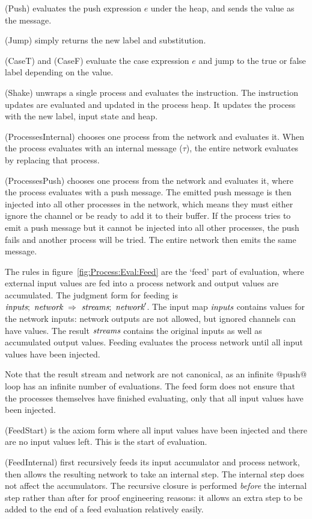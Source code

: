 (Push) evaluates the push expression $e$ under the heap, and sends the value as the message.

(Jump) simply returns the new label and substitution.

(CaseT) and (CaseF) evaluate the case expression $e$ and jump to the true or false label depending on the value.

(Shake) unwraps a single process and evaluates the instruction.
The instruction updates are evaluated and updated in the process heap.
It updates the process with the new label, input state and heap.

(ProcessesInternal) chooses one process from the network and evaluates it.
When the process evaluates with an internal message ($\tau$), the entire network evaluates by replacing that process.

(ProcessesPush) chooses one process from the network and evaluates it, where the process evaluates with a push message.
The emitted push message is then injected into all other processes in the network, which means they must either ignore the channel or be ready to add it to their buffer.
If the process tries to emit a push message but it cannot be injected into all other processes, the push fails and another process will be tried.
The entire network then emits the same message.

The rules in figure~\ref{fig:Process:Eval:Feed} are the `feed' part of evaluation, where external input values are fed into a process network and output values are accumulated.
The judgment form for feeding is $\textit{inputs};~\textit{network}~\Rightarrow~\textit{streams};~\textit{network}'$.
The input map $\textit{inputs}$ contains values for the network inputs: network outputs are not allowed, but ignored channels can have values.
The result $\textit{streams}$ contains the original inputs as well as accumulated output values.
Feeding evaluates the process network until all input values have been injected.

Note that the result stream and network are not canonical, as an infinite @push@ loop has an infinite number of evaluations.
The feed form does not ensure that the processes themselves have finished evaluating, only that all input values have been injected.

(FeedStart) is the axiom form where all input values have been injected and there are no input values left.
This is the start of evaluation.

(FeedInternal) first recursively feeds its input accumulator and process network, then allows the resulting network to take an internal step.
The internal step does not affect the accumulators.
The recursive closure is performed \emph{before} the internal step rather than after for proof engineering reasons: it allows an extra step to be added to the end of a feed evaluation relatively easily.

